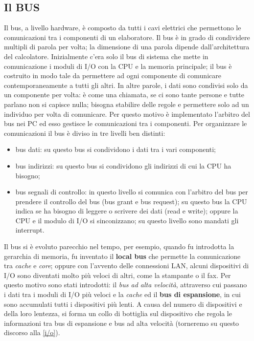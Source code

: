 \documentclass{article}
\begin{document}
\subsection{Il BUS}
Il bus, a livello hardware, è composto da tutti i cavi elettrici che permettono le comunicazioni tra i componenti di un elaboratore. Il bus è in grado di condividere multipli di parola per volta; la dimensione di una parola dipende dall'architettura del calcolatore. Inizialmente c'era solo il bus di sistema che mette in comunicazione i moduli di I/O con la CPU e la memoria principale; il bus è costruito in modo tale da permettere ad ogni componente di comunicare contemporaneamente a tutti gli altri. In altre parole, i dati sono condivisi solo da un componente per volta: è come una chiamata, se ci sono tante persone e tutte parlano non si capisce nulla; bisogna stabilire delle regole e permettere solo ad un individuo per volta di comunicare. Per questo motivo è implementato l'arbitro del bus nei PC ed esso gestisce le comunicazioni tra i componenti. Per organizzare le comunicazioni il bus è diviso in tre livelli ben distinti:
\begin{itemize}
	\item bus dati: su questo bus si condividono i dati tra i vari componenti;

	\item bus indirizzi: su questo bus si condividono gli indirizzi di cui la CPU ha bisogno;

	\item bus segnali di controllo: in questo livello si comunica con l'arbitro del bus per prendere il controllo del bus (bus grant e bus request); su questo bus la CPU indica se ha bisogno di leggere o scrivere dei dati (read e write); oppure la CPU e il modulo di I/O si sinconizzano; su questo livello sono mandati gli interrupt.
\end{itemize}

Il bus si è evoluto parecchio nel tempo, per esempio, quando fu introdotta la gerarchia di memoria, fu inventato il \textbf{local bus} che permette la comunicazione tra \textit{cache} e \textit{core}; oppure con l'avvento delle connessioni LAN, alcuni dispositivi di I/O sono diventati molto più veloci di altri, come la stampante o il fax. Per questo motivo sono stati introdotti: il \textit{bus ad alta velocità}, attraverso cui passano i dati tra i moduli di I/O più veloci e la \textit{cache} ed il \textbf{bus di espansione}, in cui sono accumulati tutti i dispositivi più lenti. A causa del numero di dispositivi e della loro lentezza, si forma un collo di bottiglia sul dispositivo che regola le informazioni tra bus di espansione e bus ad alta velocità (torneremo su questo discorso alla \autoref{i/o}).
\end{document}
